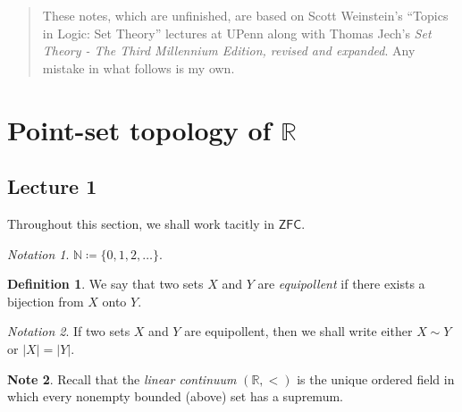 \documentclass[10pt,letterpaper,cm]{nupset}
\theoremstyle{definition}
\newtheorem{definition}{Definition}[subsection]
\newtheorem{note}[definition]{Note}
\theoremstyle{theorem}
\theoremstyle{remark}
\newtheorem*{notation}{Notation}
\newcommand{\N}{\mathbb N}
\newcommand{\R}{\mathbb R}
\newcommand{\1}{\mathbf{1}}
\newcommand{\0}{\vec 0}
\newcommand{\zfc}{\mathsf{ZFC}}
\begin{document}
\thispagestyle{empty}
\begin{abstract}
These notes, which are unfinished, are based on Scott Weinstein's ``Topics in Logic: Set Theory'' lectures at UPenn along with  Thomas Jech's \textit{Set Theory - The Third Millennium Edition, revised and expanded}. Any mistake in what follows is my own.
\end{abstract}

\tableofcontents
\newpage

\section{Point-set topology of $\R$}

\subsection{Lecture 1}

Throughout this section, we shall  work tacitly in $\zfc$.

\begin{notation}
$\N \coloneqq \{0,1,2, \ldots \}$.
\end{notation}

\begin{definition}
We say that two sets $X$ and $Y$ are \textit{equipollent} if there exists a bijection from $X$ onto $Y$. 
\end{definition}

\begin{notation}
If two sets $X$ and $Y$ are equipollent, then we shall write either $X \sim Y$ or $\lvert{X}\rvert = \lvert{Y}\rvert$.
\end{notation}

\begin{note}
Recall that the \textit{linear continuum} $(\R, <)$ is the unique ordered field in which every nonempty bounded (above) set has a supremum.  
\end{note}
\end{document}
